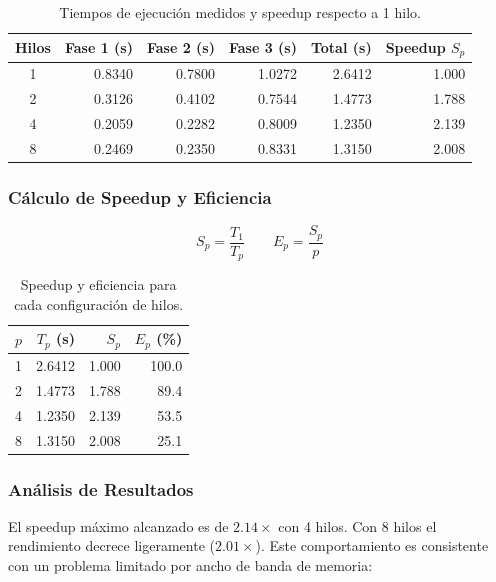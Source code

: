 \documentclass[10pt,a4paper]{article}
\begin{document}
\begin{table}[H]
\centering
\begin{tabular}{crrrrr}
\toprule
\textbf{Hilos} & \textbf{Fase 1 (s)} & \textbf{Fase 2 (s)} & \textbf{Fase 3 (s)} & \textbf{Total (s)} & \textbf{Speedup $S_p$} \\
\midrule
1 & 0.8340 & 0.7800 & 1.0272 & 2.6412 & 1.000 \\
2 & 0.3126 & 0.4102 & 0.7544 & 1.4773 & 1.788 \\
4 & 0.2059 & 0.2282 & 0.8009 & 1.2350 & 2.139 \\
8 & 0.2469 & 0.2350 & 0.8331 & 1.3150 & 2.008 \\
\bottomrule
\end{tabular}
\caption{Tiempos de ejecuci\'on medidos y speedup respecto a 1 hilo.}
\end{table}

\subsubsection{C\'alculo de Speedup y Eficiencia}

\[
S_p = \frac{T_1}{T_p} \qquad E_p = \frac{S_p}{p}
\]

\begin{table}[H]
\centering
\begin{tabular}{crrr}
\toprule
$p$ & $T_p$ (s) & $S_p$ & $E_p$ (\%) \\
\midrule
1 & 2.6412 & 1.000 & 100.0 \\
2 & 1.4773 & 1.788 & 89.4 \\
4 & 1.2350 & 2.139 & 53.5 \\
8 & 1.3150 & 2.008 & 25.1 \\
\bottomrule
\end{tabular}
\caption{Speedup y eficiencia para cada configuraci\'on de hilos.}
\end{table}

\subsubsection{An\'alisis de Resultados}

El speedup m\'aximo alcanzado es de $2.14\times$ con 4 hilos. Con 8 hilos el
rendimiento decrece ligeramente ($2.01\times$). Este comportamiento es
consistente con un problema limitado por ancho de banda de memoria:
\end{document}
